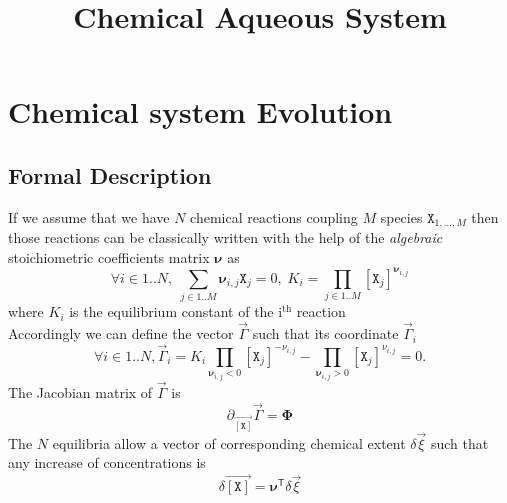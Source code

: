 \documentclass[aps,twocolumn]{revtex4}
\newcommand{\myconc}[1]{\left\lbrack #1 \right\rbrack}
\newcommand{\mychem}[1]{{\mathtt{#1}}}
\newcommand{\species}{\mychem{X}}
\newcommand{\mymat}[1]{\boldsymbol{#1}}
\newcommand{\mytrn}[1]{{#1}^{\mathsf{T}}}
\newcommand{\myvec}[1]{\overrightarrow{#1}}
\newcommand{\vecX}{\myvec{\myconc{\mychem{X}}}}
\begin{document}
\title{Chemical Aqueous System}

\maketitle

\section{Chemical system Evolution}
\subsection{Formal Description}
If we assume that we have $N$ chemical reactions coupling $M$ species $\species_{1,\ldots,M}$ then those reactions can be classically written with the help
of the \textit{algebraic} stoichiometric coefficients matrix $\mymat{\nu}$ as
\begin{equation}
	\label{eq:Ki}
	\forall i \in 1..N, \; \sum_{j\in1..M} \mymat{\nu}_{i,j} \species_j = 0, \; K_i=\prod_{j\in1..M} \myconc{\species_j}^{\mymat{\nu}_{i,j}}
\end{equation}
where $K_i$ is the equilibrium constant of the i$^{\text{th}}$ reaction\\
Accordingly we can define the vector $\vec{\Gamma}$ such that its coordinate $\vec{\Gamma}_i$
\begin{equation}
	\label{eq:Gamma}
	\forall i \in 1..N, \vec{\Gamma}_i = K_i \prod_{\mymat{\nu}_{i,j}<0} \myconc{\species_j}^{-\nu_{i,j}} - \prod_{\mymat{\nu}_{i,j}>0} \myconc{\species_j}^{\nu_{i,j}} = 0.
\end{equation}
The Jacobian matrix of $\vec{\Gamma}$ is
\begin{equation}
	\partial_{\vecX} \vec{\Gamma} = \mymat{\Phi}
\end{equation}
The $N$ equilibria allow a vector of corresponding chemical extent $\delta\vec{\xi}$ such that any increase of concentrations is
\begin{equation}
	\delta\vecX = \mytrn{\mymat{\nu}} \delta\vec{\xi}
\end{equation}
\end{document}
